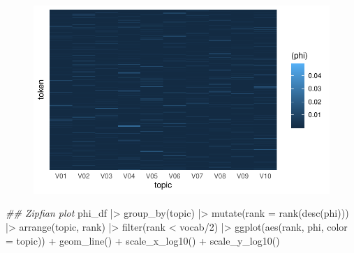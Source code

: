 \documentclass[
]{article}
\newenvironment{Shaded}{\begin{snugshade}}{\end{snugshade}}
\newcommand{\AttributeTok}[1]{\textcolor[rgb]{0.40,0.45,0.13}{#1}}
\newcommand{\DecValTok}[1]{\textcolor[rgb]{0.68,0.00,0.00}{#1}}
\newcommand{\DocumentationTok}[1]{\textcolor[rgb]{0.37,0.37,0.37}{\textit{#1}}}
\newcommand{\FunctionTok}[1]{\textcolor[rgb]{0.28,0.35,0.67}{#1}}
\newcommand{\NormalTok}[1]{\textcolor[rgb]{0.00,0.23,0.31}{#1}}
\newcommand{\SpecialCharTok}[1]{\textcolor[rgb]{0.37,0.37,0.37}{#1}}
\begin{document}
\begin{figure}[H]

{\centering \includegraphics{paper_files/figure-pdf/unnamed-chunk-6-1.pdf}

}

\end{figure}

\begin{Shaded}
\begin{Highlighting}[]
\DocumentationTok{\#\# Zipfian plot}
\NormalTok{phi\_df }\SpecialCharTok{|\textgreater{}}
    \FunctionTok{group\_by}\NormalTok{(topic) }\SpecialCharTok{|\textgreater{}}
    \FunctionTok{mutate}\NormalTok{(}\AttributeTok{rank =} \FunctionTok{rank}\NormalTok{(}\FunctionTok{desc}\NormalTok{(phi))) }\SpecialCharTok{|\textgreater{}}
    \FunctionTok{arrange}\NormalTok{(topic, rank) }\SpecialCharTok{|\textgreater{}}
    \FunctionTok{filter}\NormalTok{(rank }\SpecialCharTok{\textless{}}\NormalTok{ vocab}\SpecialCharTok{/}\DecValTok{2}\NormalTok{) }\SpecialCharTok{|\textgreater{}}
    \FunctionTok{ggplot}\NormalTok{(}\FunctionTok{aes}\NormalTok{(rank, phi, }\AttributeTok{color =}\NormalTok{ topic)) }\SpecialCharTok{+}
    \FunctionTok{geom\_line}\NormalTok{() }\SpecialCharTok{+}
    \FunctionTok{scale\_x\_log10}\NormalTok{() }\SpecialCharTok{+}
    \FunctionTok{scale\_y\_log10}\NormalTok{()}
\end{Highlighting}
\end{Shaded}
\end{document}
